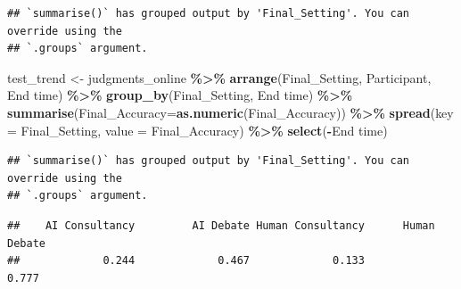 \documentclass[
]{article}
\newenvironment{Shaded}{\begin{snugshade}}{\end{snugshade}}
\newcommand{\AttributeTok}[1]{\textcolor[rgb]{0.13,0.29,0.53}{#1}}
\newcommand{\ControlFlowTok}[1]{\textcolor[rgb]{0.13,0.29,0.53}{\textbf{#1}}}
\newcommand{\DecValTok}[1]{\textcolor[rgb]{0.00,0.00,0.81}{#1}}
\newcommand{\FunctionTok}[1]{\textcolor[rgb]{0.13,0.29,0.53}{\textbf{#1}}}
\newcommand{\NormalTok}[1]{#1}
\newcommand{\OtherTok}[1]{\textcolor[rgb]{0.56,0.35,0.01}{#1}}
\newcommand{\SpecialCharTok}[1]{\textcolor[rgb]{0.81,0.36,0.00}{\textbf{#1}}}
\newcommand{\StringTok}[1]{\textcolor[rgb]{0.31,0.60,0.02}{#1}}
\begin{document}
\begin{verbatim}
## `summarise()` has grouped output by 'Final_Setting'. You can override using the
## `.groups` argument.
\end{verbatim}

\begin{Shaded}
\begin{Highlighting}[]
\NormalTok{test\_trend }\OtherTok{\textless{}{-}}\NormalTok{ judgments\_online }\SpecialCharTok{\%\textgreater{}\%}
  \FunctionTok{arrange}\NormalTok{(Final\_Setting, Participant, }\StringTok{\textasciigrave{}}\AttributeTok{End time}\StringTok{\textasciigrave{}}\NormalTok{) }\SpecialCharTok{\%\textgreater{}\%}
  \FunctionTok{group\_by}\NormalTok{(Final\_Setting, }\StringTok{\textasciigrave{}}\AttributeTok{End time}\StringTok{\textasciigrave{}}\NormalTok{) }\SpecialCharTok{\%\textgreater{}\%}
  \FunctionTok{summarise}\NormalTok{(}\AttributeTok{Final\_Accuracy=}\FunctionTok{as.numeric}\NormalTok{(Final\_Accuracy)) }\SpecialCharTok{\%\textgreater{}\%}
  \FunctionTok{spread}\NormalTok{(}\AttributeTok{key =}\NormalTok{ Final\_Setting, }\AttributeTok{value =}\NormalTok{ Final\_Accuracy) }\SpecialCharTok{\%\textgreater{}\%}
  \FunctionTok{select}\NormalTok{(}\SpecialCharTok{{-}}\StringTok{\textasciigrave{}}\AttributeTok{End time}\StringTok{\textasciigrave{}}\NormalTok{)}
\end{Highlighting}
\end{Shaded}

\begin{verbatim}
## `summarise()` has grouped output by 'Final_Setting'. You can override using the
## `.groups` argument.
\end{verbatim}

\begin{Shaded}
\end{Shaded}

\begin{verbatim}
##    AI Consultancy         AI Debate Human Consultancy      Human Debate 
##             0.244             0.467             0.133             0.777
\end{verbatim}
\end{document}
